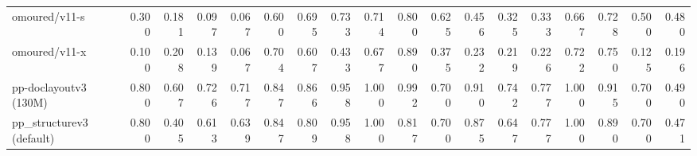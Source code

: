 \documentclass[border=2pt]{standalone}
\begin{document}
\begin{tabular}{lrrrrrrrrrrrrrrrrr}
omoured/v11-s & 0.300 & 0.181 & 0.097 & 0.067 & 0.600 & 0.695 & 0.733 & 0.714 & 0.800 & 0.625 & 0.456 & 0.325 & 0.333 & 0.667 & 0.728 & 0.500 & 0.480 \\
omoured/v11-x & 0.100 & 0.208 & 0.139 & 0.067 & 0.704 & 0.607 & 0.433 & 0.677 & 0.890 & 0.375 & 0.232 & 0.219 & 0.226 & 0.722 & 0.750 & 0.125 & 0.196 \\
pp-doclayoutv3 (130M) & 0.800 & 0.607 & 0.726 & 0.717 & 0.847 & 0.866 & 0.958 & 1.000 & 0.992 & 0.700 & 0.910 & 0.742 & 0.777 & 1.000 & 0.915 & 0.700 & 0.490 \\
pp\_structurev3 (default) & 0.800 & 0.405 & 0.613 & 0.639 & 0.847 & 0.809 & 0.958 & 1.000 & 0.817 & 0.700 & 0.875 & 0.647 & 0.777 & 1.000 & 0.890 & 0.700 & 0.471 \\
\bottomrule
\end{tabular}
\end{document}
